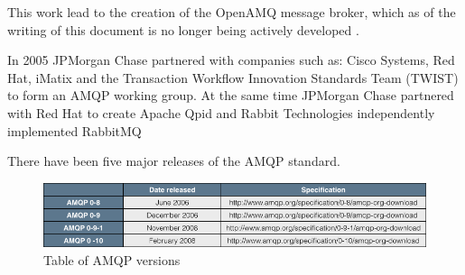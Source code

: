 \documentclass{thesis}
\begin{document}
This work lead to the creation of the OpenAMQ message broker, which as of the writing of this document is no longer being actively developed \cite{OPEN_AMQ}. 

In 2005 JPMorgan Chase partnered with companies such as: Cisco Systems, Red Hat, iMatix and the Transaction Workflow Innovation Standards Team (TWIST) to form an AMQP working group.  At the same time JPMorgan Chase partnered with Red Hat to create Apache Qpid \cite{QPID_HOMEPAGE} and Rabbit Technologies independently implemented RabbitMQ %

There have been five major releases of the AMQP standard.

\begin{figure}
\centering
\vspace{2.0in} 
\includegraphics[scale=.5]{amqp_versions}  
\caption{Table of AMQP versions }
\label{Figure 1}  
\end{figure}





\end{document}
